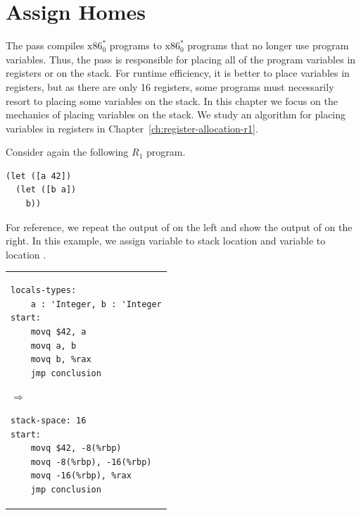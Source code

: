 \documentclass[11pt]{book}
\begin{document}
\section{Assign Homes}
\label{sec:assign-r1}

The  pass compiles $\text{x86}^{*}_0$ programs to
$\text{x86}^{*}_0$ programs that no longer use program variables.
Thus, the  pass is responsible for placing all of
the program variables in registers or on the stack. For runtime
efficiency, it is better to place variables in registers, but as there
are only 16 registers, some programs must necessarily resort to
placing some variables on the stack. In this chapter we focus on the
mechanics of placing variables on the stack. We study an algorithm for
placing variables in registers in
Chapter~\ref{ch:register-allocation-r1}.

Consider again the following $R_1$ program.
\begin{lstlisting}
(let ([a 42])
  (let ([b a])
    b))
\end{lstlisting}
For reference, we repeat the output of  on
the left and show the output of  on the right.
%
%
In this example, we assign variable  to stack location
 and variable  to location
.\\
\begin{tabular}{l}
  \begin{minipage}{0.4\textwidth}
\begin{lstlisting}[basicstyle=\ttfamily\footnotesize]
locals-types:
    a : 'Integer, b : 'Integer
start: 
    movq $42, a
    movq a, b
    movq b, %rax
    jmp conclusion
\end{lstlisting}
\end{minipage}
{$\Rightarrow$}
\begin{minipage}{0.4\textwidth}
\begin{lstlisting}[basicstyle=\ttfamily\footnotesize]
stack-space: 16
start:
    movq $42, -8(%rbp)
    movq -8(%rbp), -16(%rbp)
    movq -16(%rbp), %rax
    jmp conclusion
\end{lstlisting}
\end{minipage}
\end{tabular} \\
\end{document}
